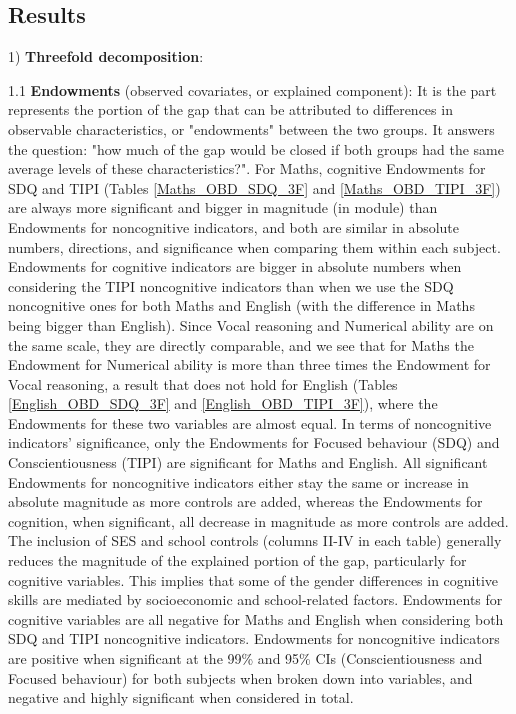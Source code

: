 \documentclass[12pt,a4paper,onecolumn]{article}
\numberwithin{equation}{section}
\begin{document}
\subsection{Results}
1) \textbf{Threefold decomposition}:

1.1 \textbf{Endowments} (observed covariates, or explained component): It is the part represents the portion of the gap that can be attributed to differences in observable characteristics, or "endowments" between the two groups. It answers the question: "how much of the gap would be closed if both groups had the same average levels of these characteristics?". For Maths, cognitive Endowments for SDQ and TIPI (Tables \ref{Maths_OBD_SDQ_3F} and \ref{Maths_OBD_TIPI_3F}) are always more significant and bigger in magnitude (in module) than Endowments for noncognitive indicators, and both are similar in absolute numbers, directions, and significance when comparing them within each subject. Endowments for cognitive indicators are bigger in absolute numbers when considering the TIPI noncognitive indicators than when we use the SDQ noncognitive ones for both Maths and English (with the difference in Maths being bigger than English). Since Vocal reasoning and Numerical ability are on the same scale, they are directly comparable, and we see that for Maths the Endowment for Numerical ability is more than three times the Endowment for Vocal reasoning, a result that does not hold for English (Tables \ref{English_OBD_SDQ_3F} and \ref{English_OBD_TIPI_3F}), where the Endowments for these two variables are almost equal. In terms of noncognitive indicators' significance, only the Endowments for Focused behaviour (SDQ) and Conscientiousness (TIPI) are significant for Maths and English. All significant Endowments for noncognitive indicators either stay the same or increase in absolute magnitude as more controls are added, whereas the Endowments for cognition, when significant, all decrease in magnitude as more controls are added. The inclusion of SES and school controls (columns II-IV in each table) generally reduces the magnitude of the explained portion of the gap, particularly for cognitive variables. This implies that some of the gender differences in cognitive skills are mediated by socioeconomic and school-related factors. Endowments for cognitive variables are all negative for Maths and English when considering both SDQ and TIPI noncognitive indicators. Endowments for noncognitive indicators are positive when significant at the 99\% and 95\% CIs (Conscientiousness and Focused behaviour) for both subjects when broken down into variables, and negative and highly significant when considered in total.
\end{document}
